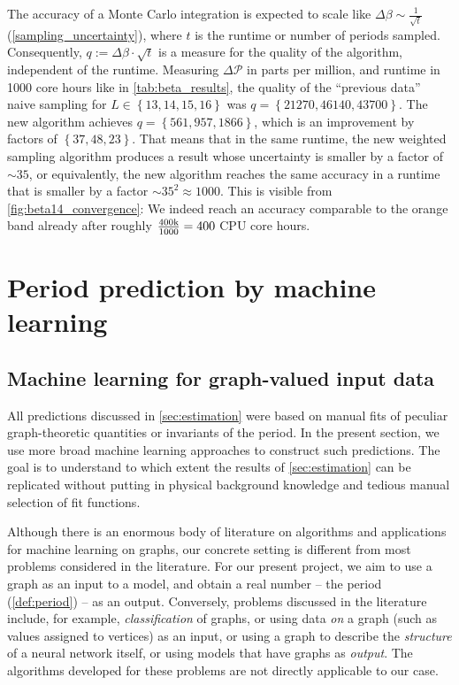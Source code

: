 \documentclass[12pt]{article}
\numberwithin{equation}{section}
\newcommand{\period}{\mathcal P}
\begin{document}
The accuracy of a Monte Carlo integration is expected to scale like $\Delta \beta \sim \frac{1}{\sqrt t}$ (\cref{sampling_uncertainty}), where $t$ is the runtime or number of periods sampled. Consequently, $q:=\Delta \beta  \cdot \sqrt t$ is a measure for the quality of the algorithm,   independent of the runtime. Measuring $\Delta \period$ in parts per million, and runtime in 1000 core hours like in \cref{tab:beta_results}, the quality of the \enquote{previous data} naive sampling for $L\in \left \lbrace 13,14,15,16 \right \rbrace $ was $q=\left \lbrace 21270,46140,43700  \right \rbrace $. The new algorithm achieves $q=\left \lbrace 561,957,1866 \right \rbrace $, which is an improvement by  factors of $\left \lbrace 37,48, 23 \right \rbrace    $. That means that in the same runtime, the new weighted sampling algorithm produces a result whose uncertainty is smaller by a factor of $\sim 35$, or equivalently, the new algorithm reaches the same  accuracy in a runtime that is smaller by a factor $\sim 35^2\approx 1000$. This is visible from  \cref{fig:beta14_convergence}: We indeed reach an accuracy comparable to the orange band already after roughly $ \frac{400 \text k}{1000}=400$ CPU core hours.







\newpage 
\section{Period prediction by machine learning}\label{sec:machine_learning}



\subsection{Machine learning for graph-valued input data} \label{sec:ML_introduction}

All predictions discussed in \cref{sec:estimation} were based on manual fits of peculiar graph-theoretic quantities or invariants of the period. In the present section, we use more broad machine learning approaches to construct such predictions. The goal is to understand to which extent the results of \cref{sec:estimation} can be replicated without putting in physical background knowledge and tedious manual selection of fit functions. 


Although there is an enormous body of literature on algorithms and applications for machine learning on graphs, our concrete setting is different from most problems considered in the literature. For our present project, we aim to use a graph as an input to a model, and obtain a real number -- the period (\cref{def:period}) -- as an output. Conversely, problems discussed in the literature include, for example, \emph{classification} of graphs, or using data \emph{on} a graph (such as values assigned to vertices) as an input, or using a graph to describe the \emph{structure} of a neural network itself, or using models that have graphs as \emph{output}. The algorithms developed for these problems are not directly applicable to our case. 
\end{document}
